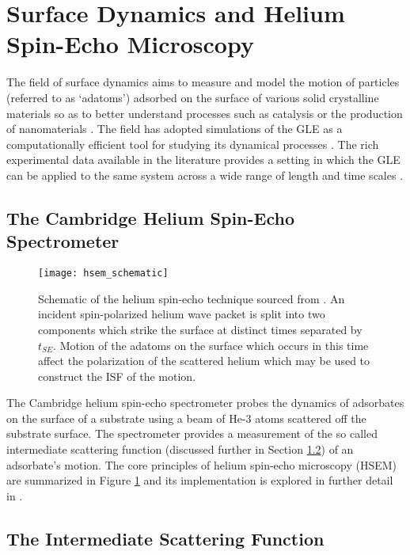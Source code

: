 \section{Surface Dynamics and Helium Spin-Echo Microscopy}

The field of surface dynamics aims to measure and model the motion of particles (referred to as `adatoms') adsorbed on the surface of various solid crystalline materials so as to better understand processes such as catalysis or the production of nanomaterials \cite{B810769F}. The field has adopted simulations of the GLE as a computationally efficient tool for studying its dynamical processes \cite{Ward, Townsend, AVIDOR2019145}. The rich experimental data available in the literature provides a setting in which the GLE can be applied to the same system across a wide range of length and time scales \cite{JARDINE2009323, HSEM}.

\subsection{The Cambridge Helium Spin-Echo Spectrometer}

\begin{figure}
	\centering
	\texttt{[image: hsem\_schematic]}
	\caption{Schematic of the helium spin-echo technique sourced from \cite{B810769F}. An incident spin-polarized helium wave packet is split into two components which strike the surface at distinct times separated by $t_{SE}$. Motion of the adatoms on the surface which occurs in this time affect the polarization of the scattered helium which may be used to construct the ISF of the motion.}
	\label{fig:hsem}
\end{figure}

The Cambridge helium spin-echo spectrometer probes the dynamics of adsorbates on the surface of a substrate using a beam of He-3 atoms scattered off the substrate surface. The spectrometer provides a measurement of the so called intermediate scattering function (discussed further in Section \ref{sec:isf_intro}) of an adsorbate's motion. The core principles of helium spin-echo microscopy (HSEM) are summarized in Figure \ref{fig:hsem} and its implementation is explored in further detail in \cite{Ward, HSEM, JARDINE2009323}.

\subsection{The Intermediate Scattering Function} \label{sec:isf_intro}

